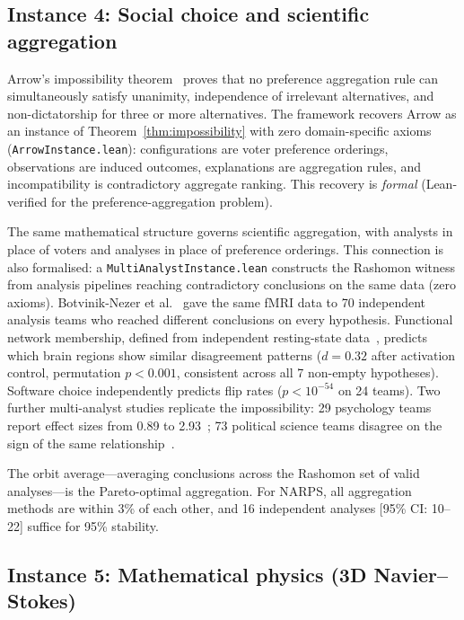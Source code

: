 \documentclass[11pt]{article}
\begin{document}
\subsection*{Instance 4: Social choice and scientific aggregation}

Arrow's impossibility theorem~\citep{arrow1951social} proves that no
preference aggregation rule can simultaneously satisfy unanimity,
independence of irrelevant alternatives, and non-dictatorship for three
or more alternatives.  The framework recovers Arrow as an instance of
Theorem~\ref{thm:impossibility} with zero domain-specific axioms
(\texttt{ArrowInstance.lean}): configurations are voter preference orderings,
observations are induced outcomes, explanations are aggregation rules,
and incompatibility is contradictory aggregate ranking.  This recovery
is \emph{formal} (Lean-verified for the preference-aggregation problem).

The same mathematical structure governs scientific aggregation, with
analysts in place of voters and analyses in place of preference orderings.
This connection is also formalised: a \texttt{MultiAnalystInstance.lean}
constructs the Rashomon witness from analysis pipelines reaching
contradictory conclusions on the same data (zero axioms).  Botvinik-Nezer et
al.~\citep{botviniknezer2020variability} gave the same fMRI data to 70
independent analysis teams who reached different conclusions on every
hypothesis.  Functional network membership, defined from independent
resting-state data~\citep{yeo2011organization}, predicts which brain
regions show similar disagreement patterns ($d = 0.32$ after activation
control, permutation $p < 0.001$, consistent across all 7 non-empty
hypotheses).  Software choice independently predicts flip rates
($p < 10^{-54}$ on 24 teams).  Two further multi-analyst studies replicate
the impossibility: 29 psychology teams report effect sizes from 0.89 to
2.93~\citep{silberzahn2018many}; 73 political science teams disagree on
the sign of the same relationship~\citep{breznau2022observing}.

The orbit average---averaging conclusions across the Rashomon set of valid
analyses---is the Pareto-optimal aggregation.  For NARPS, all
aggregation methods are within 3\% of each other, and 16 independent
analyses [95\% CI: 10--22] suffice for 95\% stability.

\subsection*{Instance 5: Mathematical physics (3D Navier--Stokes)}
\end{document}
